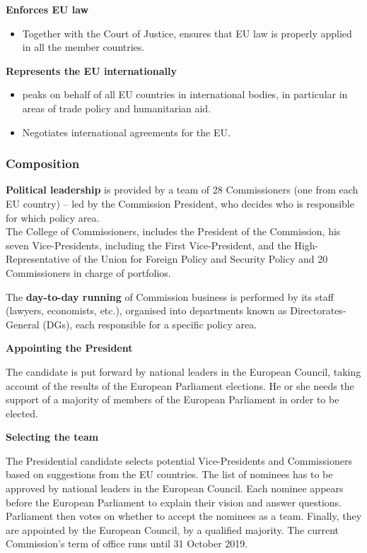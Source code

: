 	\textbf{Enforces EU law}
	\begin{itemize}
		\item Together with the Court of Justice, ensures that EU law is properly applied in all the member countries.
	\end{itemize}

	\textbf{Represents the EU internationally}
	\begin{itemize}
		\item peaks on behalf of all EU countries in international bodies, in particular in areas of trade policy and humanitarian aid.
		\item Negotiates international agreements for the EU.
	\end{itemize}

\subsubsection{Composition}
\textbf{Political leadership} is provided by a team of 28 Commissioners (one from each EU country) – led by the Commission President, who decides who is responsible for which policy area.
\\

The College of Commissioners, includes the President of the Commission, his seven Vice-Presidents, including the First Vice-President, and the High-Representative of the Union for Foreign Policy and Security Policy and 20 Commissioners in charge of portfolios.

The \textbf{day-to-day running} of Commission business is performed by its staff (lawyers, economists, etc.), organised into departments known as Directorates-General (DGs), each responsible for a specific policy area. 

\clearpage
\textbf{Appointing the President}

The candidate is put forward by national leaders in the European Council, taking account of the results of the European Parliament elections. He or she needs the support of a majority of members of the European Parliament in order to be elected.

\textbf{Selecting the team}

The Presidential candidate selects potential Vice-Presidents and Commissioners based on suggestions from the EU countries. The list of nominees has to be approved by national leaders in the European Council.
Each nominee appears before the European Parliament to explain their vision and answer questions. Parliament then votes on whether to accept the nominees as a team. Finally, they are appointed by the European Council, by a qualified majority.
The current Commission's term of office runs until 31 October 2019.

